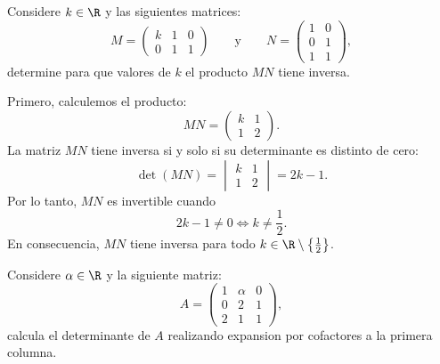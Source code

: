 \documentclass[11pt,respuestas,a4]{aleph-examen}
\begin{document}
\begin{preguntas}
\item
    Considere $k\in \R$ y las siguientes matrices:
    \[
        M=\begin{pmatrix}
            k & 1 & 0\\
            0 & 1 & 1
        \end{pmatrix}
        \qquad\text{y}\qquad
        N=\begin{pmatrix}
            1 & 0\\
            0 & 1\\
            1 & 1
        \end{pmatrix},
    \]
    determine para que valores de $k$ el producto $MN$ tiene inversa.

\begin{respuesta}
    Primero, calculemos el producto:
    \[
        MN=\begin{pmatrix}
            k & 1\\
            1 & 2
        \end{pmatrix}.
    \]
    La matriz $MN$ tiene inversa si y solo si su determinante es distinto de cero:
    \[
        \det(MN)=\begin{vmatrix}
            k & 1\\
            1 & 2
        \end{vmatrix}
        =2k-1.
    \]
    Por lo tanto, $MN$ es invertible cuando
    \[
        2k-1\neq 0 \iff k\neq \frac{1}{2}.
    \]
    En consecuencia, $MN$ tiene inversa para todo $k\in\R\setminus\left\{\frac{1}{2}\right\}$.\qedhere
\end{respuesta}

\item
    Considere $\alpha\in \R$ y la siguiente matriz:
    \[
        A=\begin{pmatrix}
            1 & \alpha & 0 \\
            0 & 2 & 1 \\
            2 & 1 & 1
        \end{pmatrix},
    \]
    calcula el determinante de $A$ realizando expansion por cofactores a la primera columna.


\end{preguntas}
\end{document}
